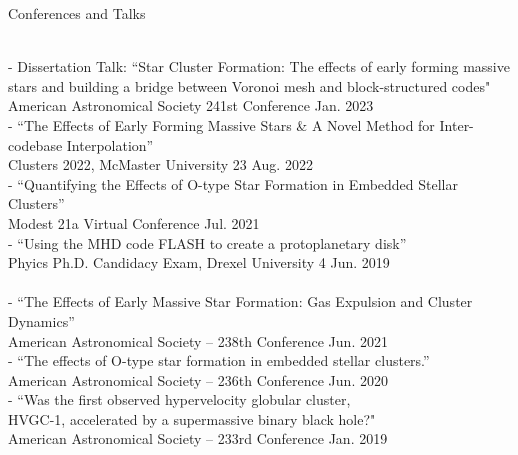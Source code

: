 \documentclass{resume} %
\newcommand{\forceindent}{\leavevmode{\parindent=1em\indent}}
\begin{document}
\begin{rSection}{Conferences and Talks}

\underline{}\\
- Dissertation Talk: ``Star Cluster Formation: The effects of early forming massive stars and building a bridge between Voronoi mesh and block-structured codes" \\
\forceindent American Astronomical Society 241st Conference \hfill Jan. 2023\\
- ``The Effects of Early Forming Massive Stars \& A Novel Method for Inter-codebase Interpolation''\\
\forceindent Clusters 2022, McMaster University \hfill 23 Aug. 2022\\
- ``Quantifying the Effects of O-type Star Formation in Embedded Stellar Clusters''\\
\forceindent Modest 21a Virtual Conference \hfill Jul. 2021\\
- ``Using the MHD code FLASH to create a protoplanetary disk''\\
\forceindent Phyics Ph.D. Candidacy Exam, Drexel University \hfill 4 Jun. 2019\\

\underline{}\\
- ``The Effects of Early Massive Star Formation: Gas Expulsion and Cluster Dynamics''\\
\forceindent American Astronomical Society -- 238th Conference \hfill Jun. 2021\\
- ``The effects of O-type star formation in embedded stellar clusters.''\\
\forceindent American Astronomical Society -- 236th Conference \hfill Jun. 2020\\
- ``Was the first observed hypervelocity globular cluster, \\ \forceindent HVGC-1, accelerated by a supermassive binary black hole?"\\
\forceindent American Astronomical Society -- 233rd Conference \hfill Jan. 2019\\

\end{rSection}
\end{document}
